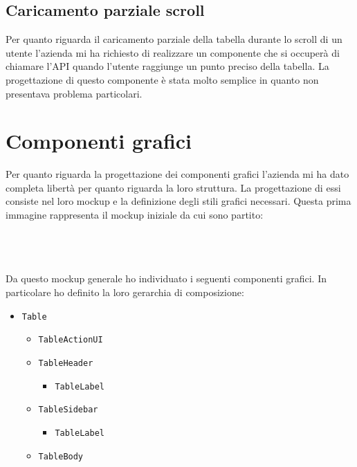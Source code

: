 \subsection*{Caricamento parziale scroll}
Per quanto riguarda il caricamento parziale della tabella durante lo scroll di un utente l'azienda mi ha richiesto di realizzare un componente che si occuperà di chiamare l'API quando l'utente raggiunge un punto preciso della tabella. La progettazione di questo componente è stata molto semplice in quanto non presentava problema particolari.

\section{Componenti grafici}
Per quanto riguarda la progettazione dei componenti grafici l'azienda mi ha dato completa libertà per quanto riguarda la loro struttura. La progettazione di essi consiste nel loro mockup e la definizione degli stili grafici necessari. Questa prima immagine rappresenta il mockup iniziale da cui sono partito: 
\\
\\
\begin{minipage}{\linewidth}
\end{minipage}
\mbox{} 
\\
\\
Da questo mockup generale ho individuato i seguenti componenti grafici. In particolare ho definito la loro gerarchia di composizione:
\begin{itemize}
	\item \verb|Table|
	\begin{itemize}
		\item \verb|TableActionUI|
		\item \verb|TableHeader|
		\begin{itemize}
			\item \verb|TableLabel|
		\end{itemize}
		\item \verb|TableSidebar|
		\begin{itemize}
			\item \verb|TableLabel|
		\end{itemize}
		\item \verb|TableBody|
	\end{itemize}
\end{itemize}


